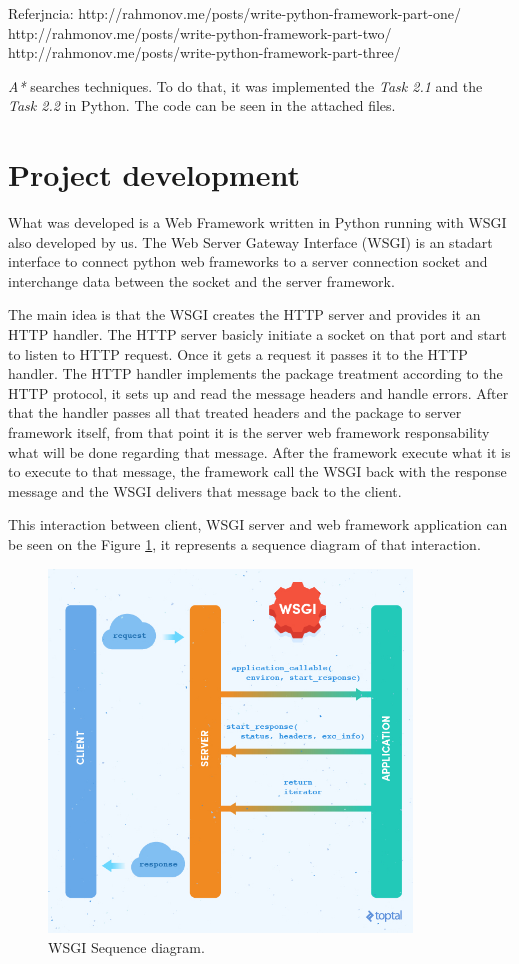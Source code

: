 \documentclass[journal,12pt,onecolumn,draftclsnofoot,]{IEEEtran}
\begin{document}
Referjncia:
http://rahmonov.me/posts/write-python-framework-part-one/
http://rahmonov.me/posts/write-python-framework-part-two/
http://rahmonov.me/posts/write-python-framework-part-three/


 \textit{A*} searches techniques. To do that, it was implemented the \textit{Task 2.1} and the \textit{Task 2.2} in Python. The code can be seen in the attached files.

\section{Project development}
What was developed is a Web Framework written in Python running with WSGI also developed by us. The Web Server Gateway Interface (WSGI) is an stadart interface to connect python web frameworks to a server connection socket and interchange data between the socket and the server framework.

The main idea is that the WSGI creates the HTTP server and provides it an HTTP handler. The HTTP server basicly initiate a socket on that port and start to listen to HTTP request. Once it gets a request it passes it to the HTTP handler. The HTTP handler implements the package treatment according to the HTTP protocol, it sets up and read the message headers and handle errors. After that the handler passes all that treated headers and the package to server framework itself, from that point it is the server web framework responsability what will be done regarding that message. After the framework execute what it is to execute to that message, the framework call the WSGI back with the response message and the WSGI delivers that message back to the client.

This interaction between client, WSGI server and web framework application can be seen on the Figure \ref{fig_wsgi}, it represents a sequence diagram of that interaction.

\begin{figure}
  \begin{center}
  \includegraphics[width=3.8in]{./imgs/wsgi.jpg}
  \caption{WSGI Sequence diagram.}
  \label{fig_wsgi}
  \end{center}
\end{figure}
\end{document}
